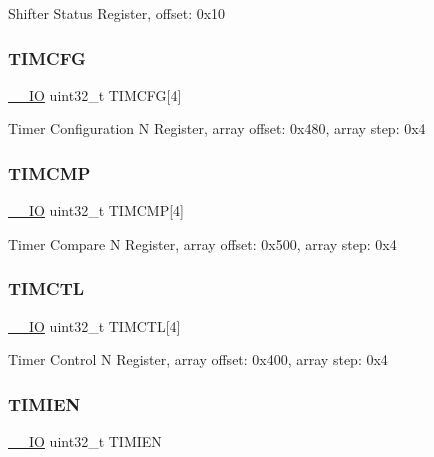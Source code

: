 Shifter Status Register, offset\+: 0x10 \mbox{\label{struct_f_l_e_x_i_o___type_ac8695d9b76d42aa68666790a03bbaed0}} 
\subsubsection{\texorpdfstring{TIMCFG}{TIMCFG}}
{\footnotesize\ttfamily \mbox{\hyperlink{core__cm0plus_8h_aec43007d9998a0a0e01faede4133d6be}{\+\_\+\+\_\+\+IO}} uint32\+\_\+t T\+I\+M\+C\+FG\mbox{[}4\mbox{]}}

Timer Configuration N Register, array offset\+: 0x480, array step\+: 0x4 \mbox{\label{struct_f_l_e_x_i_o___type_a0424c3da4002abfd507bb0264af58dcc}} 
\subsubsection{\texorpdfstring{TIMCMP}{TIMCMP}}
{\footnotesize\ttfamily \mbox{\hyperlink{core__cm0plus_8h_aec43007d9998a0a0e01faede4133d6be}{\+\_\+\+\_\+\+IO}} uint32\+\_\+t T\+I\+M\+C\+MP\mbox{[}4\mbox{]}}

Timer Compare N Register, array offset\+: 0x500, array step\+: 0x4 \mbox{\label{struct_f_l_e_x_i_o___type_a90e6c37e210075900169260e6175b601}} 
\subsubsection{\texorpdfstring{TIMCTL}{TIMCTL}}
{\footnotesize\ttfamily \mbox{\hyperlink{core__cm0plus_8h_aec43007d9998a0a0e01faede4133d6be}{\+\_\+\+\_\+\+IO}} uint32\+\_\+t T\+I\+M\+C\+TL\mbox{[}4\mbox{]}}

Timer Control N Register, array offset\+: 0x400, array step\+: 0x4 \mbox{\label{struct_f_l_e_x_i_o___type_a80a839f3568db27ac207dc4e8b9bd7a7}} 
\subsubsection{\texorpdfstring{TIMIEN}{TIMIEN}}
{\footnotesize\ttfamily \mbox{\hyperlink{core__cm0plus_8h_aec43007d9998a0a0e01faede4133d6be}{\+\_\+\+\_\+\+IO}} uint32\+\_\+t T\+I\+M\+I\+EN}

